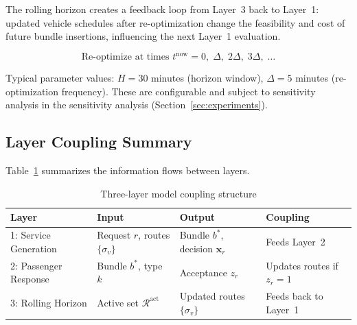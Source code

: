 The rolling horizon creates a feedback loop from Layer~3 back to Layer~1: updated vehicle
schedules after re-optimization change the feasibility and cost of future bundle insertions,
influencing the next Layer~1 evaluation.

\begin{equation}\label{eq:rh-trigger}
  \text{Re-optimize at times } t^{\text{now}} = 0,\; \Delta,\; 2\Delta,\; 3\Delta,\; \ldots
\end{equation}

Typical parameter values: $H = 30$ minutes (horizon window), $\Delta = 5$ minutes
(re-optimization frequency). These are configurable and subject to sensitivity analysis
in the sensitivity analysis (Section~\ref{sec:experiments}).

\subsection{Layer Coupling Summary}

Table~\ref{tab:layer-coupling} summarizes the information flows between layers.

\begin{table}[h]
\centering
\caption{Three-layer model coupling structure}
\label{tab:layer-coupling}
\begin{tabular}{llll}
\toprule
Layer & Input & Output & Coupling \\
\midrule
1: Service Generation & Request $r$, routes $\{\sigma_v\}$ & Bundle $b^*$, decision $\mathbf{x}_r$ & Feeds Layer~2 \\
2: Passenger Response & Bundle $b^*$, type $k$ & Acceptance $z_r$ & Updates routes if $z_r=1$ \\
3: Rolling Horizon & Active set $\mathcal{R}^{\text{act}}$ & Updated routes $\{\sigma_v\}$ & Feeds back to Layer~1 \\
\bottomrule
\end{tabular}
\end{table}

